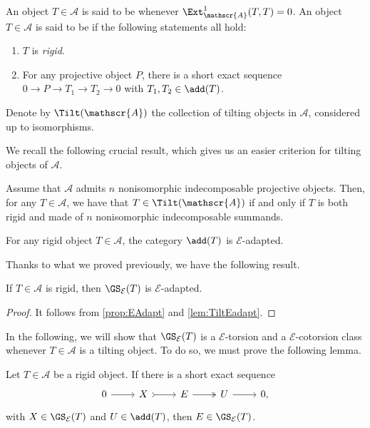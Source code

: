 \begin{definition}
\label{def:rigidtilting}
An object $T \in \mathscr{A}$ is said to be  whenever $\Ext_\mathscr{A}^1(T,T) = 0$. An object $T \in \mathscr{A}$ is said to be  if the following statements all hold:
\begin{enumerate}[label=$\bullet$, itemsep=1mm]
\item $T$ is \emph{rigid}.
\item For any projective object $P$, there is a short exact sequence $0\rightarrow P\rightarrow T_1 \rightarrow T_2\rightarrow 0$  with $T_1,T_2 \in \add(T)$.
\end{enumerate} 
Denote by $\Tilt(\mathscr{A})$ the collection of tilting objects in $\mathscr{A}$, considered up to isomorphisms.
\end{definition}

We recall the following crucial result, which gives us an easier criterion for tilting objects of $\mathscr{A}$.

\begin{prop} \label{prop:numberindectilt}
Assume that $\mathscr{A}$ admits $n$ nonisomorphic indecomposable projective objects. Then, for any $T \in \mathscr{A}$, we have that $T \in \Tilt(\mathscr{A})$ if and only if $T$ is both rigid and made of $n$ nonisomorphic indecomposable summands.
\end{prop}

\begin{lemma} \label{lem:TiltEadapt}
    For any rigid object $T \in \mathscr{A}$, the category $\add(T)$ is $\mathcal{E}$-adapted.
\end{lemma}

Thanks to what we proved previously, we have the following result.

\begin{cor} \label{cor:rigidEadapt}
    If $T \in \mathscr{A}$ is rigid, then $\GS_{\mathcal{E}}(T)$ is $\mathcal{E}$-adapted.
\end{cor}

\begin{proof}
     It follows from \cref{prop:EAdapt} and \cref{lem:TiltEadapt}.
\end{proof}

In the following, we will show that $\GS_\mathcal{E}(T)$ is a $\mathcal{E}$-torsion and a $\mathcal{E}$-cotorsion class whenever $T \in \mathscr{A}$ is a tilting object. To do so, we must prove the following lemma.

\begin{lemma}
\label{lemmaExtclosedinduction}
Let $T \in \mathscr{A}$ be a rigid object. If there is a short exact sequence 
\[\begin{tikzcd}
	0 & X & E  & U &  0,
	\arrow[from=1-1, to=1-2]
	\arrow[tail, from=1-2, to=1-3]
	\arrow[two heads,from=1-3, to=1-4]
	\arrow[from=1-4, to=1-5]
\end{tikzcd} \] with $X \in \GS_{\mathcal{E}}(T)$ and $U \in \add(T)$, then $E \in \GS_{\mathcal{E}}(T)$.
\end{lemma}

